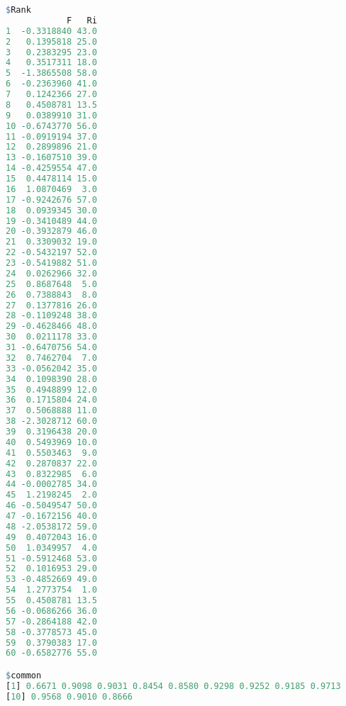 \documentclass[11pt,a4paper,oneside]{book}
\begin{document}
\begin{lstlisting}[language=r]
$Rank
            F   Ri
1  -0.3318840 43.0
2   0.1395818 25.0
3   0.2383295 23.0
4   0.3517311 18.0
5  -1.3865508 58.0
6  -0.2363960 41.0
7   0.1242366 27.0
8   0.4508781 13.5
9   0.0389910 31.0
10 -0.6743770 56.0
11 -0.0919194 37.0
12  0.2899896 21.0
13 -0.1607510 39.0
14 -0.4259554 47.0
15  0.4478114 15.0
16  1.0870469  3.0
17 -0.9242676 57.0
18  0.0939345 30.0
19 -0.3410489 44.0
20 -0.3932879 46.0
21  0.3309032 19.0
22 -0.5432197 52.0
23 -0.5419882 51.0
24  0.0262966 32.0
25  0.8687648  5.0
26  0.7388843  8.0
27  0.1377816 26.0
28 -0.1109248 38.0
29 -0.4628466 48.0
30  0.0211178 33.0
31 -0.6470756 54.0
32  0.7462704  7.0
33 -0.0562042 35.0
34  0.1098390 28.0
35  0.4948899 12.0
36  0.1715804 24.0
37  0.5068888 11.0
38 -2.3028712 60.0
39  0.3196438 20.0
40  0.5493969 10.0
41  0.5503463  9.0
42  0.2870837 22.0
43  0.8322985  6.0
44 -0.0002785 34.0
45  1.2198245  2.0
46 -0.5049547 50.0
47 -0.1672156 40.0
48 -2.0538172 59.0
49  0.4072043 16.0
50  1.0349957  4.0
51 -0.5912468 53.0
52  0.1016953 29.0
53 -0.4852669 49.0
54  1.2773754  1.0
55  0.4508781 13.5
56 -0.0686266 36.0
57 -0.2864188 42.0
58 -0.3778573 45.0
59  0.3790383 17.0
60 -0.6582776 55.0

$common
[1] 0.6671 0.9098 0.9031 0.8454 0.8580 0.9298 0.9252 0.9185 0.9713
[10] 0.9568 0.9010 0.8666
\end{lstlisting}
\end{document}

